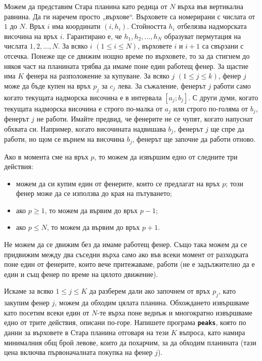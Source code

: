 \documentclass[12pt]{article}
\begin{document}
\renewcommand{\headerLang}{Български}
\renewcommand{\problemName}{?. PEAKS}

\renewcommand{\headerLeft}{IATI Day 1, Senior group}
\renewcommand{\headerRightFirst}{XVII INTERNATIONAL ADVANCED TOURNAMENT IN INFORMATICS}
\renewcommand{\headerRightSecond}{BURGAS 2026}

\renewcommand{\tl}{$3$ сек.}
\renewcommand{\ml}{$256$ MB}
\problem{Задача \problemName}

Можем да представим Стара планина като редица от $N$ върха във вертикална равнина. Да ги наречем просто „върхове“. Върховете са номерирани с числата от $1$ до $N$. Връх $i$ има координати $(i, h_i)$. Стойността $h_i$ отбелязва надморската височина на връх $i$. Гарантирано е, че $h_1, h_2, \dots, h_ N$ образуват пермутация на числата $1, 2, \dots,  N$. За всяко $i$ $(1 \le i \le  N)$, върховете $i$ и $i+1$ са свързани с отсечка. Понеже ще се движим нощно време по върховете, то за да стигнем до някоя част на планината трябва да имаме поне един работещ фенер. За щастие има $K$ фенера на разположение за купуване. За всяко $j$ $(1 \le j \le k)$, фенер $j$ може да бъде купен на връх $p_j$ за $c_j$ лева. За съжаление, фенерът $j$ работи само когато текущата надморска височина е в интервала $[a_j; b_j]$. С други думи, когато текущата надморска височина е строго по-малка от $a_j$ или строго по-голяма от $b_j$, фенерът $j$ не работи. Имайте предвид, че фенерите не се чупят, когато напуснат обхвата си. Например, когато височината надвишава $b_j$, фенерът $j$ ще спре да работи, но щом се върнем на височина $b_j$, фенерът ще започне да работи отново.

Ако в момента сме на връх $p$, то можем да извършим едно от следните три действия:
\begin{itemize}
	\item можем да си купим един от фенерите, които се предлагат на връх $p$; този фенер може да се използва до края на пътуването;
	\item ако $p \ge 1$, то можем да вървим до връх $p-1$;
	\item ако $p \le  N$, то можем да вървим до връх $p+1$.
\end{itemize}
Не можем да се движим без да имаме работещ фенер. Също така можем да се придвижим между два съседни върха само ако във всеки момент от разходката поне един от фенерите, които вече притежаваме, работи (не е задължително да е един и същ фенер по време на цялото движение).

Искаме за всяко $1 \le j \le K$ да разберем дали ако започнем от връх $p_j$, като закупим фенер $j$, можем да обходим цялата планина. Обхождането извършваме като посетим всеки един от $N$-те върха поне веднъж и многократно извършваме едно от трите действия, описани по-горе. Напишете програма \textbf{\texttt{peaks}}, която по данни за върховете в Стара планина отговаря на тези $K$ въпроса, като намира минималния общ брой левове, които да похарчим, за да обходим планината (тази цена включва първоначалната покупка на фенер $j$).
\end{document}
